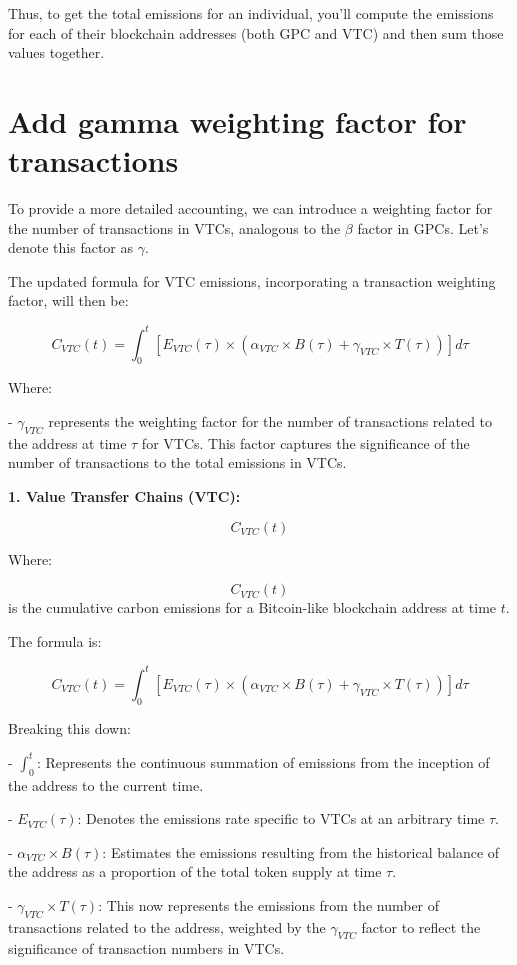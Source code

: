 \documentclass[12pt,a4paper]{report}
\begin{document}
Thus, to get the total emissions for an individual, you'll compute the emissions for each of their blockchain addresses (both GPC and VTC) and then sum those values together.

\section{Add gamma weighting factor for transactions}

To provide a more detailed accounting, we can introduce a weighting factor for the number of transactions in VTCs, analogous to the \( \beta \) factor in GPCs. Let's denote this factor as \( \gamma \).

The updated formula for VTC emissions, incorporating a transaction weighting factor, will then be:

\[ C_{VTC}(t) = \int_{0}^{t} [E_{VTC}(\tau) \times (\alpha_{VTC} \times B(\tau) + \gamma_{VTC} \times T(\tau))] d\tau \]

Where:

- \( \gamma_{VTC} \) represents the weighting factor for the number of transactions related to the address at time \( \tau \) for VTCs. This factor captures the significance of the number of transactions to the total emissions in VTCs.


\textbf{1. Value Transfer Chains (VTC):}

\[ C_{VTC}(t) \]

Where:

\[ C_{VTC}(t) \] is the cumulative carbon emissions for a Bitcoin-like blockchain address at time \( t \).

The formula is:

\[ C_{VTC}(t) = \int_{0}^{t} [E_{VTC}(\tau) \times (\alpha_{VTC} \times B(\tau) + \gamma_{VTC} \times T(\tau))] d\tau \]

Breaking this down:

- \( \int_{0}^{t} \): Represents the continuous summation of emissions from the inception of the address to the current time.

- \( E_{VTC}(\tau) \): Denotes the emissions rate specific to VTCs at an arbitrary time \( \tau \).

- \( \alpha_{VTC} \times B(\tau) \): Estimates the emissions resulting from the historical balance of the address as a proportion of the total token supply at time \( \tau \).

- \( \gamma_{VTC} \times T(\tau) \): This now represents the emissions from the number of transactions related to the address, weighted by the \( \gamma_{VTC} \) factor to reflect the significance of transaction numbers in VTCs.
\end{document}
